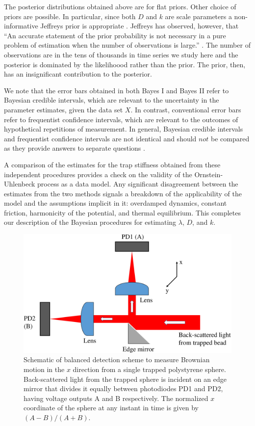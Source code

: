 \documentclass[fleqn,10pt]{wlscirep}
\begin{document}
The posterior distributions obtained above are for flat priors. Other
choice of priors are possible. In particular, since both $D$ and
$k$ are scale parameters a non-informative Jeffreys prior is appropriate
\cite{jeffreys1998theory}. Jeffreys has observed, however, that ``An
accurate statement of the prior probability is not necessary in a
pure problem of estimation when the number of observations is large.''
\cite{jeffreys1998theory}. The number of observations are in the
tens of thousands in time series we study here and the posterior is
dominated by the likelihoood rather than the prior. The prior, then,
has an insignificant contribution to the posterior. 

We note that the error bars obtained in both Bayes I and Bayes II
refer to Bayesian credible intervals, which are relevant to the uncertainty
in the parameter estimates, given the data set $X$. In contrast,
conventional error bars refer to frequentist confidence intervals,
which are relevant to the outcomes of hypothetical repetitions of
measurement. In general, Bayesian credible intervals and frequentist
confidence intervals are not identical and should $not$ be compared
as they provide answers to separate questions \cite{jaynes1976confidence}. 

A comparison of the estimates for the trap stiffness obtained from
these independent procedures provides a check on the validity of the
Ornstein-Uhlenbeck process as a data model. Any significant disagreement
between the estimates from the two methods signals a breakdown of
the applicability of the model and the assumptions implicit in it:
overdamped dynamics, constant friction, harmonicity of the potential,
and thermal equilibrium. This completes our description of the Bayesian
procedures for estimating $\lambda$, $D$, and $k$.
\begin{figure}[t]
\includegraphics[scale=0.27]{figure1}\caption{Schematic of balanced detection scheme to measure Brownian motion
in the $x$ direction from a single trapped polystyrene sphere. Back-scattered
light from the trapped sphere is incident on an edge mirror that divides
it equally between photodiodes PD1 and PD2, having voltage outputs
A and B respectively. The normalized $x$ coordinate of the sphere
at any instant in time is given by $(A-B)/(A+B).$\label{fig:balanced-detection}}
\end{figure}
\end{document}
